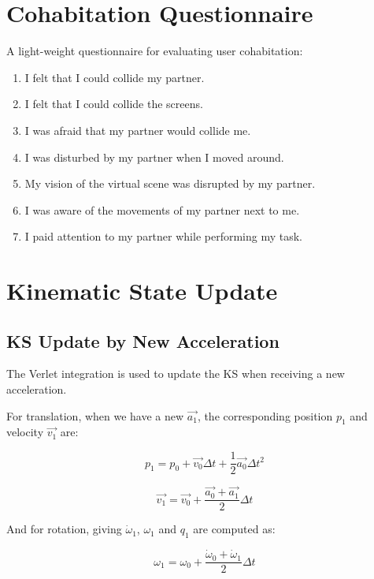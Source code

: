 \begin{appendices}
\chapter{Cohabitation Questionnaire}
\label{appendix:cohab_q}
A light-weight questionnaire for evaluating user cohabitation:
\begin{enumerate}
	\item I felt that I could collide my partner.
	\item I felt that I could collide the screens.
	\item I was afraid that my partner would collide me.
	\item I was disturbed by my partner when I moved around.
	\item My vision of the virtual scene was disrupted by my partner.
	\item I was aware of the movements of my partner next to me.
	\item I paid attention to my partner while performing my task.
\end{enumerate}

\chapter{Kinematic State Update}
\label{appendix:ks}

\section*{KS Update by New Acceleration}
The Verlet integration is used to update the KS when receiving a new acceleration.

For translation, when we have a new $\overrightarrow{a_{1}}$, the corresponding position $p_{1}$ and velocity $\overrightarrow{v_{1}}$ are:

\begin{equation}
p_{1}=p_{0}+\overrightarrow{v_{0}}\Delta t+\frac{1}{2}\overrightarrow{a_{0}}\Delta t^{2}
\end{equation}

\begin{equation}
\overrightarrow{v_{1}}=\overrightarrow{v_{0}}+\frac{\overrightarrow{a_{0}}+\overrightarrow{a_{1}}}{2}\Delta t
\end{equation}

And for rotation, giving $\dot{\omega}_{1}$, $\omega_{1}$ and $q_{1}$ are computed as:

\begin{equation}
\omega_{1}=\omega_{0}+\frac{\dot{\omega}_{0}+\dot{\omega}_{1}}{2}\Delta t
\end{equation}


\end{appendices}

